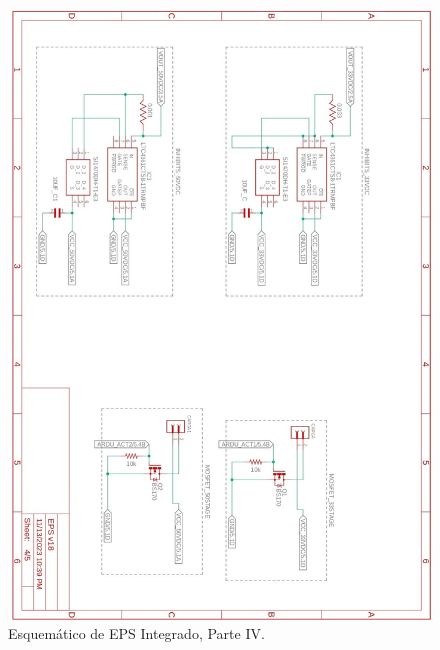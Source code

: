 \newpage
\begin{figure}[h]
  \centering
  \includegraphics[width=\textwidth]{Pictures/EPS_Sheets_page-0004.jpg}
  \caption{Esquemático de EPS Integrado, Parte IV.}
  \label{fig:EPS_Sheet4}
\end{figure}

